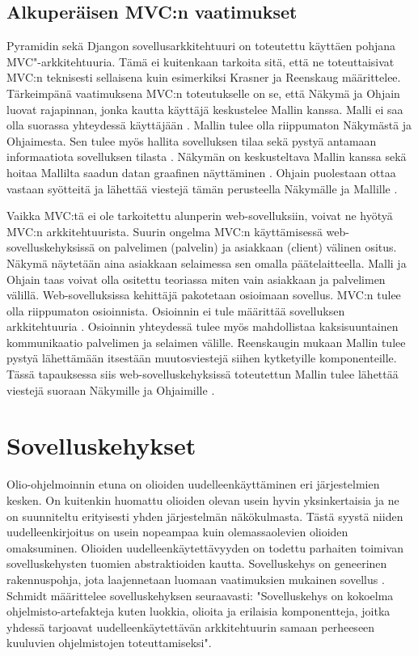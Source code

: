 \documentclass[utf8]{gradu3}
\begin{document}
\section{Alkuperäisen MVC:n vaatimukset}
Pyramidin sekä Djangon sovellusarkkitehtuuri on toteutettu käyttäen pohjana MVC"-arkkitehtuuria. Tämä ei kuitenkaan tarkoita sitä, että ne toteuttaisivat MVC:n teknisesti sellaisena kuin esimerkiksi Krasner \parencite{krasner_desc} ja Reenskaug \parencite{reenskaug_tools} määrittelee. Tärkeimpänä vaatimuksena MVC:n toteutukselle on se, että Näkymä ja Ohjain luovat rajapinnan, jonka kautta käyttäjä keskustelee Mallin kanssa. Malli ei saa olla suorassa yhteydessä käyttäjään \parencite[s. 10]{reenskaug_tools}. Mallin tulee olla riippumaton Näkymästä ja Ohjaimesta. Sen tulee myös hallita sovelluksen tilaa sekä pystyä antamaan informaatiota sovelluksen tilasta \parencite{burbeck}. Näkymän on keskusteltava Mallin kanssa sekä hoitaa Mallilta saadun datan graafinen näyttäminen \parencite[s.1]{reenskaug_orig}. Ohjain puolestaan ottaa vastaan syötteitä ja lähettää viestejä tämän perusteella Näkymälle ja Mallille \parencite{burbeck}.

Vaikka MVC:tä ei ole tarkoitettu alunperin web-sovelluksiin, voivat ne hyötyä MVC:n arkkitehtuurista. Suurin ongelma MVC:n käyttämisessä web-sovelluskehyksissä on palvelimen (palvelin) ja asiakkaan (client) välinen ositus. Näkymä näytetään aina asiakkaan selaimessa sen omalla päätelaitteella. Malli ja Ohjain taas voivat olla ositettu teoriassa miten vain asiakkaan ja palvelimen välillä. Web-sovelluksissa kehittäjä pakotetaan osioimaan sovellus. MVC:n tulee olla riippumaton osioinnista. Osioinnin ei tule määrittää sovelluksen arkkitehtuuria \parencite{ibm_watson}. Osioinnin yhteydessä tulee myös mahdollistaa kaksisuuntainen kommunikaatio palvelimen ja selaimen välille. Reenskaugin mukaan Mallin tulee pystyä lähettämään itsestään muutosviestejä siihen kytketyille komponenteille. Tässä tapauksessa siis web-sovelluskehyksissä toteutettun Mallin tulee lähettää viestejä suoraan Näkymille ja Ohjaimille \parencite{reenskaug_tools}. 

\chapter{Sovelluskehykset}
Olio-ohjelmoinnin etuna on olioiden uudelleenkäyttäminen eri järjestelmien kesken. On kuitenkin huomattu olioiden olevan usein hyvin yksinkertaisia ja ne on suunniteltu erityisesti yhden järjestelmän näkökulmasta. Tästä syystä niiden uudelleenkirjoitus on usein nopeampaa kuin olemassaolevien olioiden omaksuminen. Olioiden uudelleenkäytettävyyden on todettu parhaiten toimivan sovelluskehysten tuomien abstraktioiden kautta. Sovelluskehys on geneerinen rakennuspohja, jota laajennetaan luomaan vaatimuksien mukainen sovellus \parencite[s. 431]{Sommerville}. Schmidt \parencite{frameworks} määrittelee sovelluskehyksen seuraavasti: "Sovelluskehys on kokoelma ohjelmisto-artefakteja kuten luokkia, olioita ja erilaisia komponentteja, joitka yhdessä tarjoavat uudelleenkäytettävän arkkitehtuurin samaan perheeseen kuuluvien ohjelmistojen toteuttamiseksi".
\end{document}
